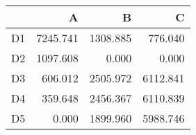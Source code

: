 \begin{tabular}{lrrr}
\toprule
     &        A &        B &        C \\
\midrule
 D1  & \num{7245.741} & \num{1308.885} &  \num{776.040} \\
 D2  & \num{1097.608} &    \num{0.000} &    \num{0.000} \\
 D3  &  \num{606.012} & \num{2505.972} & \num{6112.841} \\
 D4  &  \num{359.648} & \num{2456.367} & \num{6110.839} \\
 D5  &    \num{0.000} & \num{1899.960} & \num{5988.746} \\
\bottomrule
\end{tabular}